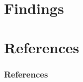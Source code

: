 \documentclass[t]{beamer}
\begin{document}

  \section{Findings}

  \section{References}
  \begin{frame}[allowframebreaks] %
    \frametitle{References}
    \scriptsize{}
  \end{frame}
\end{document}
